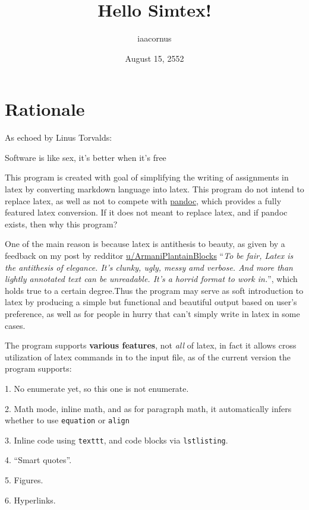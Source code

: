 \documentclass[12pt, UTF8]{article}
\title{Hello Simtex!}
\author{iaacornus}
\date{August 15, 2552}
\begin{document}
	\maketitle
	
	\section*{Rationale}
	
	As echoed by Linus Torvalds:
	
	\begin{displayquote}
		Software is like sex, it's better when it's free
	\end{displayquote}
	
	This program is created with goal of simplifying the writing of assignments in latex by converting markdown language into latex. This program do not intend to replace latex, as well as not to compete with \href{https://pandoc.org/}{pandoc}, which provides a fully featured latex conversion. If it does not meant to replace latex, and if pandoc exists, then why this program?
	
	One of the main reason is because latex is antithesis to beauty, as given by a feedback on my post by redditor \href{https://www.reddit.com/user/ArmaniPlantainBlocks/}{u/ArmaniPlantainBlocks} ``\emph{To be fair, Latex is the antithesis of elegance. It's clunky, ugly, messy amd verbose. And more than lightly annotated text can be unreadable. It's a horrid format to work in.}'', which holds true to a certain degree.Thus the program may serve as soft introduction to latex by producing a simple but functional and beautiful output based on user's preference, as well as for people in hurry that can't simply write in latex in some cases.
	
	The program supports \textbf{various features}, not \textit{all} of latex, in fact it allows cross utilization of latex commands in to the input file, as of the current version the program supports:
	
	1. No enumerate yet, so this one is not enumerate.
	
	2. Math mode, inline math, and as for paragraph math, it automatically infers whether to use \texttt{equation} or \texttt{align}
	
	3. Inline code using \texttt{texttt{}}, and code blocks via \texttt{lstlisting}.
	
	4. ``Smart quotes''.
	
	5. Figures.
	
	6. Hyperlinks.
	
\end{document}
